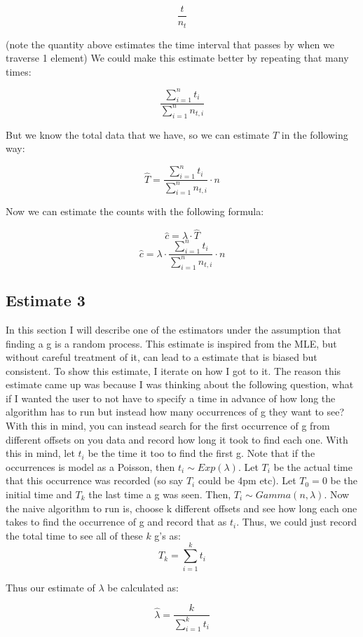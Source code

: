 \documentclass[a4paper]{article}
\begin{document}
$$\frac{t}{n_t}$$

(note the quantity above estimates the time interval that passes by when we traverse 1 element) We could make this estimate better by repeating that many times:

$$\frac{\sum^{n}_{i=1} t_i}{\sum^{n}_{i=1}n_{t, i}}$$

 But we know the total data that we have, so we can estimate $T$ in the following way:

$$\hat{T} = \frac{\sum^{n}_{i=1} t_i}{\sum^{n}_{i=1}n_{t, i}} \cdot n$$

Now we can estimate the counts with the following formula:

$$\hat{c} = \lambda \cdot \hat{T} $$
$$\hat{c}  = \lambda \cdot \frac{\sum^{n}_{i=1} t_i}{\sum^{n}_{i=1}n_{t, i}} \cdot n$$

\subsection{Estimate 3}

In this section I will describe one of the estimators under the assumption that finding a g is a random process.
This estimate is inspired from the MLE, but without careful treatment of it, can lead to a estimate that is biased but consistent.
To show this estimate, I iterate on how I got to it.
The reason this estimate came up was because I was thinking about the following question, what if I wanted the user to not have to specify a time in advance of how long the algorithm has to run but instead how many occurrences of g they want to see?
With this in mind, you can instead search for the first occurrence of g from different offsets on you data and record how long it took to find each one.
With this in mind, let $t_i$ be the time it too to find the first g.
Note that if the occurrences is model as a Poisson, then $t_i \sim Exp(\lambda)$.
Let $T_i$ be the actual time that this occurrence was recorded (so say $T_i$ could be 4pm etc).
Let $T_0 = 0$ be the initial time and $T_k$ the last time a g was seen.
Then, $T_i \sim Gamma(n, \lambda)$.
Now the naive algorithm to run is, choose k different offsets and see how long each one takes to find the occurrence of g and record that as $t_i$.
Thus, we could just record the total time to see all of these $k$ g's as: 
$$ T_k = \sum^{k}_{i=1} t_i$$

Thus our estimate of $\lambda$ be calculated as:

$$\hat{\lambda} = \frac{k}{\sum^{k}_{i=1} t_i}$$
\end{document}
